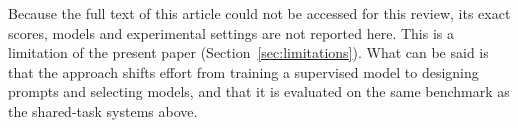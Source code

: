 Because the full text of this article could not be accessed for this review, its exact scores, models and experimental settings are not reported here. This is a limitation of the present paper (Section~\ref{sec:limitations}). What can be said is that the approach shifts effort from training a supervised model to designing prompts and selecting models, and that it is evaluated on the same benchmark as the shared-task systems above.
